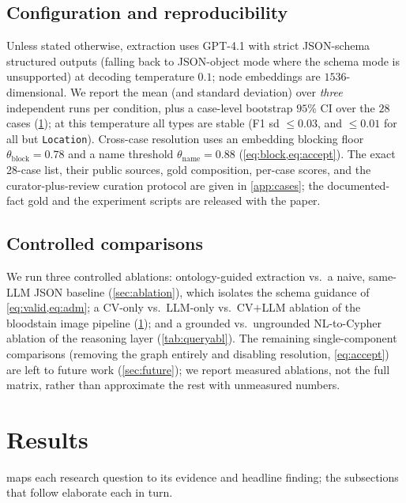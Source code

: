 \documentclass[conference]{IEEEtran}
\newcommand{\node}[1]{\texttt{#1}}
\begin{document}
\subsection{Configuration and reproducibility}
\label{sec:config}
Unless stated otherwise, extraction uses GPT-4.1 with strict JSON-schema
structured outputs (falling back to JSON-object mode where the schema mode is
unsupported) at decoding temperature $0.1$; node embeddings are
$1536$-dimensional. We report the mean (and standard deviation) over \emph{three}
independent runs per condition, plus a case-level bootstrap $95\%$ CI over the $28$
cases (\cref{sec:results}); at this temperature all types are stable
(F1 sd $\le 0.03$, and $\le0.01$ for all but \node{Location}). Cross-case resolution uses an embedding blocking floor
$\theta_{\text{block}}=0.78$ and a name threshold $\theta_{\text{name}}=0.88$
(\cref{eq:block,eq:accept}). The exact 28-case list, their public sources, gold
composition, per-case scores, and the curator-plus-review curation protocol are given in
\cref{app:cases}; the documented-fact gold and the experiment scripts are released
with the paper.

\subsection{Controlled comparisons}
\label{sec:baselines}
We run three controlled ablations: ontology-guided extraction vs.\ a naive,
same-LLM JSON baseline (\cref{sec:ablation}), which isolates the schema guidance
of \cref{eq:valid,eq:adm}; a CV-only vs.\ LLM-only vs.\ CV$+$LLM ablation of
the bloodstain image pipeline (\cref{sec:results}); and a grounded vs.\ ungrounded
NL-to-Cypher ablation of the reasoning layer (\cref{tab:queryabl}). The remaining
single-component comparisons (removing the graph entirely and
disabling resolution, \cref{eq:accept}) are left to future work
(\cref{sec:future}); we report measured ablations, not the full matrix, rather
than approximate the rest with unmeasured numbers.

\section{Results}
\label{sec:results}

 maps each research question to its evidence and headline finding;
the subsections that follow elaborate each in turn.
\end{document}
